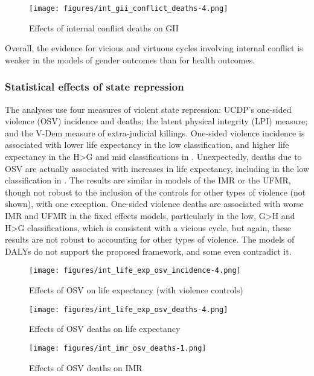 \documentclass[12pt]{article}
\begin{document}
\begin{figure}[!htb]
    \centering
    \caption{Effects of internal conflict deaths on GII}
    \label{int_gii_conflict_deaths}
    \texttt{[image: figures/int\_gii\_conflict\_deaths-4.png]}
\end{figure}

Overall, the evidence for vicious and virtuous cycles involving internal conflict is weaker in the models of gender outcomes than for health outcomes.

\subsubsection{Statistical effects of state repression}

The analyses use four measures of violent state repression: UCDP's one-sided violence (OSV) incidence and deaths; the latent physical integrity (LPI) measure; and the V-Dem measure of extra-judicial killings.
One-sided violence incidence is associated with lower life expectancy in the low classification, and higher life expectancy in the H>G and mid classifications in .
Unexpectedly, deaths due to OSV are actually associated with increases in life expectancy, including in the low classification in .
The results are similar in models of the IMR or the UFMR, though not robust to the inclusion of the controls for other types of violence (not shown), with one exception.
One-sided violence deaths are associated with worse IMR and UFMR in the fixed effects models, particularly in the low, G>H and H>G classifications, which is consistent with a vicious cycle, but again, these results are not robust to accounting for other types of violence.
The models of DALYs do not support the proposed framework, and some even contradict it.

\begin{figure}[!htb]
    \centering
    \caption{Effects of OSV on life expectancy (with violence controls)}
    \label{int_life_exp_osv_incidence}
    \texttt{[image: figures/int\_life\_exp\_osv\_incidence-4.png]}
\end{figure}
\begin{figure}[!htb]
    \centering
    \caption{Effects of OSV deaths on life expectancy}
    \label{int_life_exp_osv_deaths}
    \texttt{[image: figures/int\_life\_exp\_osv\_deaths-4.png]}
\end{figure}
\begin{figure}[!htb]
    \centering
    \caption{Effects of OSV deaths on IMR}
    \label{int_imr_osv_deaths}
    \texttt{[image: figures/int\_imr\_osv\_deaths-1.png]}
\end{figure}
\end{document}
